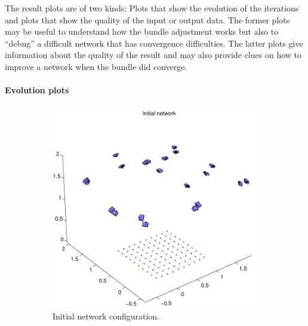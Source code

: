 \documentclass{article}
\begin{document}
The result plots are of two kinds: Plots that show the evolution of
the iterations and plots that show the quality of the input or output
data. The former plots may be useful to understand how the bundle
adjustment works but also to ``debug'' a difficult network that has
convergence difficulties. The latter plots give information about the
quality of the result and may also provide clues on how to improve a
network when the bundle did converge.

\paragraph{Evolution plots}

\begin{figure}
  \centering
  \begin{subfigure}[b]{0.49\textwidth}
    \includegraphics[width=\textwidth]{ill/ccamx0}
    \caption{Initial network configuration.\\~}
    \label{fig:camx0}
  \end{subfigure}%
  \begin{subfigure}[b]{0.49\textwidth}

\end{subfigure}
\end{figure}
\end{document}
